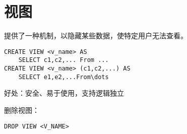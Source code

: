 \section{视图}

提供了一种机制，以隐藏某些数据，使特定用户无法查看。

\begin{lstlisting}[style=sqlstyle]
CREATE VIEW <v_name> AS 
    SELECT c1,c2,... From ...
CREATE VIEW <v_name> (c1,c2,...) AS 
    SELECT e1,e2,...From\dots   
\end{lstlisting}

好处：安全、易于使用，支持逻辑独立

删除视图：
\begin{lstlisting}[style=sqlstyle]
DROP VIEW <V_NAME>    
\end{lstlisting}